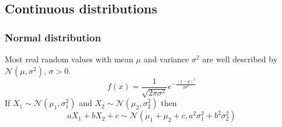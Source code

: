\subsection{Continuous distributions}



\subsubsection{Normal distribution}
Most real random values with mean $\mu$ and variance $\sigma^2$ are well described by $\mathcal{N}(\mu,\sigma^2),\,\sigma>0$.
\[ f(x) = \frac{1}{\sqrt{2\pi\sigma^2}}e^{-\frac{(x-\mu)^2}{2\sigma^2}} \]
If $X_1 \sim \mathcal{N}(\mu_1,\sigma_1^2)$ and $X_2 \sim \mathcal{N}(\mu_2,\sigma_2^2)$ then
\[ aX_1 + bX_2 + c \sim \mathcal{N}(\mu_1+\mu_2+c,a^2\sigma_1^2+b^2\sigma_2^2) \]


